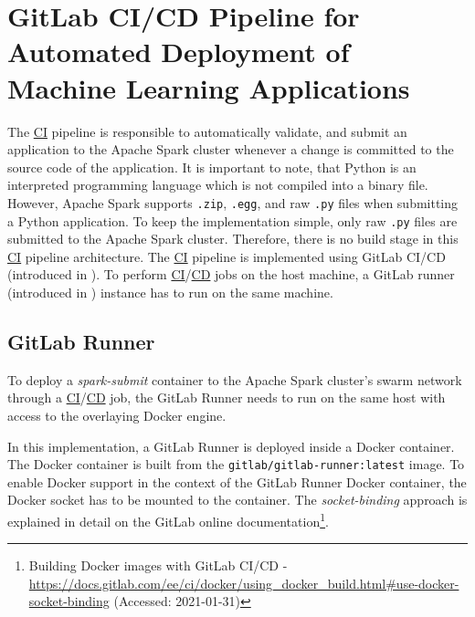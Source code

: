 \section{GitLab CI/CD Pipeline for Automated Deployment of Machine Learning Applications}
\label{sec:06_pipeline}
%
The \hyperlink{abbr:ci}{CI} pipeline is responsible to automatically validate, and submit an application to the Apache Spark cluster whenever a change is committed to the source code of the application.
It is important to note, that Python is an interpreted programming language which is not compiled into a binary file. However, Apache Spark supports \texttt{.zip}, \texttt{.egg}, and raw \texttt{.py} files when submitting a Python application. To keep the implementation simple, only raw \texttt{.py} files are submitted to the Apache Spark cluster. Therefore, there is no build stage in this \hyperlink{abbr:ci}{CI} pipeline architecture.
%
The \hyperlink{abbr:ci}{CI} pipeline is implemented using GitLab CI/CD (introduced in ).
%
To perform \hyperlink{abbr:ci}{CI}/\hyperlink{abbr:cd}{CD} jobs on the host machine, a GitLab runner (introduced in ) instance has to run on the same machine.


\subsection{GitLab Runner}
\label{subsec:06_pipeline_runner}
To deploy a \textit{spark-submit} container to the Apache Spark cluster's swarm network through a \hyperlink{abbr:ci}{CI}/\hyperlink{abbr:cd}{CD} job, the GitLab Runner needs to run on the same host with access to the overlaying Docker engine.


In this implementation, a GitLab Runner is deployed inside a Docker container.
The Docker container is built from the \texttt{gitlab/gitlab-runner:latest} image.
To enable Docker support in the context of the GitLab Runner Docker container, the Docker socket has to be mounted to the container. The \textit{socket-binding} approach is explained in detail on the GitLab online documentation\footnote{Building Docker images with GitLab CI/CD  - \url{https://docs.gitlab.com/ee/ci/docker/using_docker_build.html\#use-docker-socket-binding} (Accessed: 2021-01-31)}.


